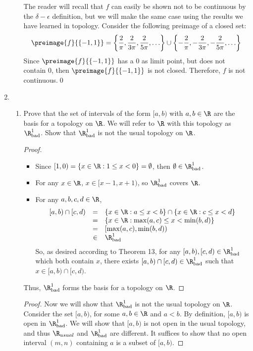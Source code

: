 \documentclass[letterpaper]{article}
\newcommand{\Rbad}{\R_\text{bad}}
\begin{document}
\begin{enumerate}
\begin{enumerate}
\begin{counterexample*}
	The reader will recall that $f$ can easily be shown not to be continuous by the $\delta-\epsilon$ definition, but we will make the same case using the results we have learned in topology. Consider the following preimage of a closed set: 
	$$\preimage{f}{\{-1,1\}}=\left\lbrace \frac{2}{\pi},\frac{2}{3\pi},\frac{2}{5\pi},\ldots\right\rbrace \cup \left\lbrace -\frac{2}{\pi},-\frac{2}{3\pi},-\frac{2}{5\pi},\ldots\right\rbrace$$
	Since $\preimage{f}{\{-1,1\}}$ has a 0 as limit point, but does not contain $0$, then $\preimage{f}{\{-1,1\}}$ is not closed. Therefore, $f$ is not continuous.\qed
	\end{counterexample*}
	\end{enumerate}
\item 
	\begin{enumerate}
	\item Prove that the set of intervals of the form $[a,b)$ with $a,b\in\R$ are the basis for a topology on $\R$. We will refer to $\R$ with this topology as $\R^1_\text{bad}$. Show that $\R^1_\text{bad}$ is not the usual topology on $\R$. 
	\begin{proof}\mbox{}
		\begin{itemize}
		\item Since $[1,0)=\{x\in\R:1\leq x < 0\}=\emptyset$, then $\emptyset\in\Rbad^1$. 
		\item For any $x\in\R$, $x\in [x-1,x+1)$, so $\Rbad^1$ covers $\R$. 
		\item For any $a,b,c,d\in\R$, 
		\[
		\begin{array}{rcl}
		[a,b)\cap[c,d)&=&\{x\in\R:a\leq x < b\}\cap \{x\in\R:c\leq x < d\}\\
		&=&\{x\in\R: \max(a,c)\leq x < \min(b,d)\}\\
		&=&[\max(a,c),\min(b,d))\\
		&\in& \Rbad^1\\
		\end{array}
		\]
		So, as desired according to Theorem 13, for any $[a,b), [c,d) \in \Rbad^1$ which both contain $x$, there exists $[a,b)\cap[c,d) \in \Rbad^1$ such that $x\in [a,b)\cap[c,d)$. 
		\end{itemize}
	Thus, $\Rbad^1$ forms the basis for a topology on $\R$.
	\end{proof}
	\begin{proof}
	Now we will show that $\R^1_\text{bad}$ is not the usual topology on $\R$. Consider the set $[a,b)$, for some $a,b \in \R$ and $a<b$. By definition, $[a,b)$ is open in $\Rbad^1$. We will show that $[a,b)$ is not open in the usual topology, and thus $\R_{usual}$ and $\Rbad^1$ are different. It suffices to show that no open interval $(m,n)$ containing $a$ is a subset of $[a,b)$.	

\end{proof}
\end{enumerate}
\end{enumerate}
\end{document}
